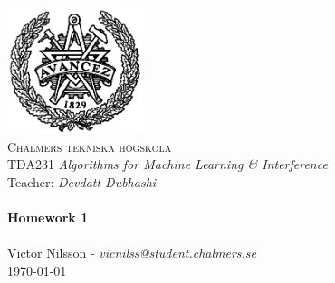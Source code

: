
\begin{titlepage}
\begin{center}


~\\[1.0cm]
 \includegraphics[width=0.3\textwidth]{chalmers.png}~\\[1.0cm]

\textsc{\LARGE Chalmers tekniska högskola}\\[0.3cm]
TDA231 \textit{Algorithms for Machine Learning \& Interference}\\
Teacher: \textit{Devdatt Dubhashi} \\

\HRule \\[0.3cm]
{ \huge \bfseries Homework 1 \\[0.3cm] }
\HRule \\[0.3cm]

Victor Nilsson  -  \textit{vicnilss@student.chalmers.se}\\ [0.3cm]


\vfill
{\large \today}

\end{center}
\end{titlepage}

\newpage